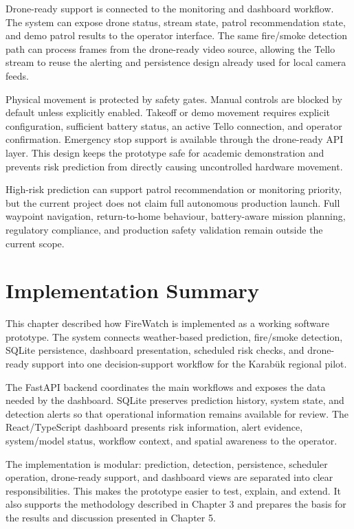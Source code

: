 Drone-ready support is connected to the monitoring and dashboard workflow.
The system can expose drone status, stream state, patrol recommendation state,
and demo patrol results to the operator interface. The same fire/smoke
detection path can process frames from the drone-ready video source, allowing
the Tello stream to reuse the alerting and persistence design already used for
local camera feeds.

Physical movement is protected by safety gates. Manual controls are blocked by
default unless explicitly enabled. Takeoff or demo movement requires explicit
configuration, sufficient battery status, an active Tello connection, and
operator confirmation. Emergency stop support is available through the
drone-ready API layer. This design keeps the prototype safe for academic
demonstration and prevents risk prediction from directly causing uncontrolled
hardware movement.

High-risk prediction can support patrol recommendation or monitoring priority,
but the current project does not claim full autonomous production launch.
Full waypoint navigation, return-to-home behaviour, battery-aware mission
planning, regulatory compliance, and production safety validation remain
outside the current scope.

\section{Implementation Summary}

This chapter described how FireWatch is implemented as a working software
prototype. The system connects weather-based prediction, fire/smoke detection,
SQLite persistence, dashboard presentation, scheduled risk checks, and
drone-ready support into one decision-support workflow for the Karabük regional
pilot.

The FastAPI backend coordinates the main workflows and exposes the data needed
by the dashboard. SQLite preserves prediction history, system state, and
detection alerts so that operational information remains available for review.
The React/TypeScript dashboard presents risk information, alert evidence,
system/model status, workflow context, and spatial awareness to the operator.

The implementation is modular: prediction, detection, persistence, scheduler
operation, drone-ready support, and dashboard views are separated into clear
responsibilities. This makes the prototype easier to test, explain, and
extend. It also supports the methodology described in Chapter 3 and prepares
the basis for the results and discussion presented in Chapter 5.
